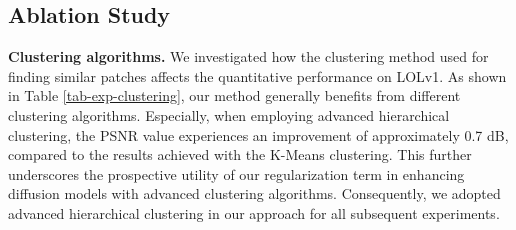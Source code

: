 \documentclass{article}
\begin{document}
\begin{table}[h]
\scriptsize
  \caption{Ablation studies of effectiveness of various clustering algorithms used in our method.}
  \vspace{-0.1cm}
  \label{tab-exp-clustering}
  \centering
\end{table}
\begin{table}[h]
\scriptsize
  \caption{Ablation studies of the effectiveness of choosing our rank-based global structure-aware regularization.}
  \label{tab-exp-regularization}
  \vspace{-0.1cm}
  \centering
\end{table}

\subsection{Ablation Study}
\label{ab-study}
\textbf{Clustering algorithms.}
We investigated how the clustering method used for finding similar patches affects the quantitative performance on LOLv1. As shown in Table \ref{tab-exp-clustering}, our method generally benefits from different clustering algorithms. Especially, when employing advanced hierarchical clustering, the PSNR value experiences an improvement of approximately 0.7 dB, compared to the results achieved with the K-Means clustering. This further underscores the prospective utility of our regularization term in enhancing diffusion models with advanced clustering algorithms. Consequently, we adopted advanced hierarchical clustering in our approach for all subsequent experiments.
\end{document}
